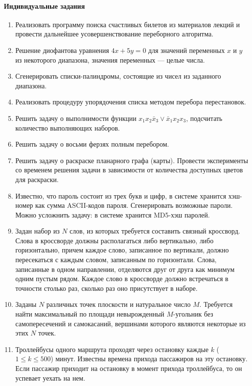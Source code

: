 \documentclass[12pt, openany, twoside]{book} %
\begin{document}
\paragraph{Индивидуальные задания}
\begin{enumerate}
\item Реализовать программу поиска счастливых билетов из материалов лекций и провести дальнейшее усовершенствование переборного алгоритма.
\item Решение диофантова уравнения $4x+5y=0$ для значений переменных $x$ и $y$ из некоторого диапазона, значения переменных --- целые числа.
\item Сгенерировать списки-палиндромы, состоящие из чисел из заданного диапазона.
\item Реализовать процедуру упорядочения списка методом перебора перестановок.
\item Решить задачу о выполнимости функции $x_1x_2\bar{x}_3\vee \bar{x}_1x_2x_3$, подсчитать количество выполняющих наборов.
\item Решить задачу о восьми ферзях полным перебором.
\item Решить задачу о раскраске планарного графа (карты). Провести эксперименты со временем решения задачи в зависимости от количества доступных цветов для раскраски.
\item Известно, что пароль состоит из трех букв и цифр, в системе хранится хэш-номер как сумма ASCII-кодов пароля. Сгенерировать возможные пароли. Можно усложнить задачу: в системе хранится MD5-хэш паролей.
\item Задан набор из $N$ слов, из которых требуется составить связный кроссворд. Слова в кроссворде должны располагаться либо вертикально, либо горизонтально, причем каждое слово, записанное по вертикали, должно пересекаться с каждым словом, записанным по горизонтали. Слова, записанные в одном направлении, отделяются друг от друга как минимум одним пустым рядом. Каждое слово в кроссворде должно встречаться в точности столько раз, сколько раз оно присутствует в наборе.
\item Заданы $N$ различных точек плоскости и натуральное число $M$. Требуется найти максимальный по площади невырожденный $M$-угольник без самопересечений и самокасаний, вершинами которого являются некоторые из этих $N$ точек.
\item Троллейбусы одного маршрута проходят через остановку
каждые $k$ ($1\leq{}k\leq{}500$) минут. Известны времена прихода пассажиров
на эту остановку. Если пассажир приходит на остановку в
момент прихода троллейбуса, то он успевает уехать на нем.


\end{enumerate}
\end{document}
